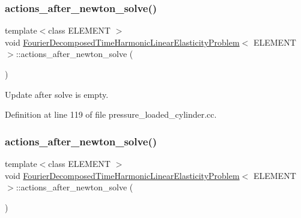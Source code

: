 \subsubsection{\texorpdfstring{actions\+\_\+after\+\_\+newton\+\_\+solve()}{actions\_after\_newton\_solve()}\hspace{0.1cm}{\footnotesize\ttfamily [1/3]}}
{\footnotesize\ttfamily template$<$class E\+L\+E\+M\+E\+NT $>$ \\
void \hyperlink{classFourierDecomposedTimeHarmonicLinearElasticityProblem}{Fourier\+Decomposed\+Time\+Harmonic\+Linear\+Elasticity\+Problem}$<$ E\+L\+E\+M\+E\+NT $>$\+::actions\+\_\+after\+\_\+newton\+\_\+solve (\begin{DoxyParamCaption}{ }\end{DoxyParamCaption})\hspace{0.3cm}{\ttfamily [inline]}}



Update after solve is empty. 



Definition at line 119 of file pressure\+\_\+loaded\+\_\+cylinder.\+cc.

\mbox{\label{classFourierDecomposedTimeHarmonicLinearElasticityProblem_ac5c25fb4658eaef91104ef7be1b0d25e}} 
\subsubsection{\texorpdfstring{actions\+\_\+after\+\_\+newton\+\_\+solve()}{actions\_after\_newton\_solve()}\hspace{0.1cm}{\footnotesize\ttfamily [2/3]}}
{\footnotesize\ttfamily template$<$class E\+L\+E\+M\+E\+NT $>$ \\
void \hyperlink{classFourierDecomposedTimeHarmonicLinearElasticityProblem}{Fourier\+Decomposed\+Time\+Harmonic\+Linear\+Elasticity\+Problem}$<$ E\+L\+E\+M\+E\+NT $>$\+::actions\+\_\+after\+\_\+newton\+\_\+solve (\begin{DoxyParamCaption}{ }\end{DoxyParamCaption})\hspace{0.3cm}{\ttfamily [inline]}}



